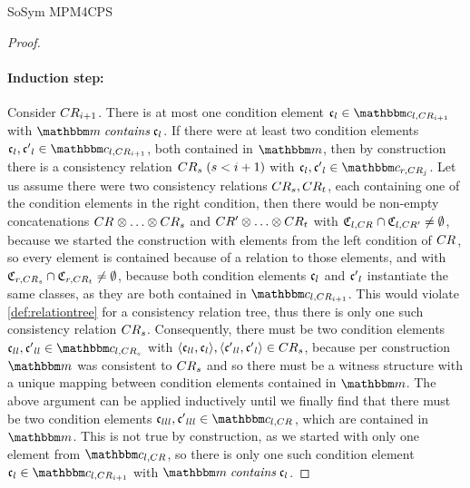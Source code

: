\begin{copiedFrom}{SoSym MPM4CPS}
\begin{proof}
    \paragraph{Induction step:}
    Consider $CR_{i+1}$.
    There is at most one condition element $\conditionelement{c}{l} \in \condition{c}{l, \consistencyrelation{CR}{i+1}}$ with $\modelset{m} \containsmath \conditionelement{c}{l}$.
    If there were at least two condition elements $\conditionelement{c}{l}, \conditionelement{c'}{l} \in \condition{c}{l,\consistencyrelation{CR}{i+1}}$, both contained in $\modelset{m}$, then by construction there is a consistency relation $CR_{s}\; (s < i+1)$ with $\conditionelement{c}{l},\conditionelement{c'}{l} \in \condition{c}{r,\consistencyrelation{CR}{j}}$.
    Let us assume there were two consistency relations $CR_{s}, CR_{t}$, each containing one of the condition elements in the right condition, then there would be non-empty concatenations $\consistencyrelation{CR}{} \concat \dots \concat \consistencyrelation{CR}{s}$ and $\consistencyrelation{CR'}{} \concat \dots \concat \consistencyrelation{CR}{t}$ with $\mathfrak{C}_{l,CR_{}} \cap \mathfrak{C}_{l,CR'_{}} \neq \emptyset$, because we started the construction with elements from the left condition of $CR_{}$, so every element is contained because of a relation to those elements, and with $\mathfrak{C}_{r,CR_{s}} \cap \mathfrak{C}_{r,CR_{t}} \neq \emptyset$, because both condition elements $\mathfrak{c}_{l}$ and $\mathfrak{c'}_{l}$ instantiate the same classes, as they are both contained in $\condition{c}{l,\consistencyrelation{CR}{i+1}}$.
    This would violate \autoref{def:relationtree} for a consistency relation tree, thus there is only one such consistency relation $CR_{s}$.
    Consequently, there must be two condition elements $\conditionelement{c}{ll}, \conditionelement{c'}{ll} \in \condition{c}{l,\consistencyrelation{CR}{s}}$ with $\langle \mathfrak{c}_{ll},\mathfrak{c}_{l} \rangle, \langle \mathfrak{c'}_{ll},\mathfrak{c'}_{l} \rangle \in CR_{s}$, because per construction $\modelset{m}$ was consistent to $CR_{s}$ and so there must be a witness structure with a unique mapping between condition elements contained in $\modelset{m}$.
    The above argument can be applied inductively until we finally find that there must be two condition elements $\conditionelement{c}{lll},\conditionelement{c'}{lll} \in \condition{c}{l,\consistencyrelation{CR}{}}$, which are contained in $\modelset{m}$.
    This is not true by construction, as we started with only one element from $\condition{c}{l,\consistencyrelation{CR}{}}$, so there is only one such condition element $\conditionelement{c}{l} \in \condition{c}{l,\consistencyrelation{CR}{i+1}}$ with $\modelset{m} \containsmath \conditionelement{c}{l}$.
    

\end{proof}
\end{copiedFrom}

